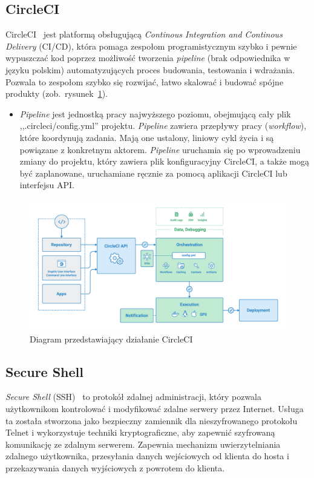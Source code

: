 	\subsection{CircleCI}
	CircleCI~\cite{circleci} jest platformą obsługującą \textit{Continous Integration and Continous Delivery} (CI/CD), która pomaga zespołom programistycznym szybko i pewnie wypuszczać kod poprzez możliwość tworzenia \textit{pipeline} (brak odpowiednika w języku polskim) automatyzujących proces budowania, testowania i wdrażania. Pozwala to zespołom szybko się rozwijać, łatwo skalować i budować spójne produkty (zob.~rysunek~\ref{rys:circleci_diagram}).
	\begin{itemize}
	\item \textit{Pipeline} jest jednostką pracy najwyższego poziomu, obejmującą cały plik ,,.circleci/config.yml'' projektu. \textit{Pipeline} zawiera przepływy pracy (\textit{workflow}), które koordynują zadania. Mają one ustalony, liniowy cykl życia i są powiązane z konkretnym aktorem. \textit{Pipeline} uruchamia się po wprowadzeniu zmiany do projektu, który zawiera plik konfiguracyjny CircleCI, a także mogą być zaplanowane, uruchamiane ręcznie za pomocą aplikacji CircleCI lub interfejsu API.
	\end{itemize}
\begin{figure}[H]
\centering\includegraphics[width=\textwidth]{figures/circleci_schema}
\caption{Diagram przedstawiający działanie CircleCI~\cite{circleci_schema}}\label{rys:circleci_diagram}
\end{figure}

	\subsection{Secure Shell}
	\textit{Secure Shell} (SSH)~\cite{ssh} to protokół zdalnej administracji, który pozwala użytkownikom kontrolować i modyfikować zdalne serwery przez Internet. Usługa ta została stworzona jako bezpieczny zamiennik dla nieszyfrowanego protokołu Telnet i wykorzystuje techniki kryptograficzne, aby zapewnić szyfrowaną komunikację ze zdalnym serwerem. Zapewnia mechanizm uwierzytelniania zdalnego użytkownika, przesyłania danych wejściowych od klienta do hosta i przekazywania danych wyjściowych z powrotem do klienta.
	
